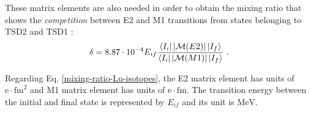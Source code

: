These matrix elements are also needed in order to obtain the mixing ratio that shows the \emph{competition} between E2 and M1 transitions from states belonging to TSD2 and TSD1 \cite{krane1970determination,toki1975asymmetric}:
\begin{align}
    \delta=8.87\cdot 10^{-4}E_{if}\frac{\bra{I_i}|\mathcal{M}(E2)|\ket{I_f}}{\bra{I_i}|\mathcal{M}(M1)|\ket{I_f}}\ .
    \label{mixing-ratio-Lu-isotopes}
\end{align}

Regarding Eq. \ref{mixing-ratio-Lu-isotopes}, the E2 matrix element has units of $\mathrm{e}\cdot\text{fm}^2$ and M1 matrix element has units of $\mathrm{e}\cdot\text{fm}$. The transition energy between the initial and final state is represented by $E_{if}$ and its unit is $\text{MeV}$.

